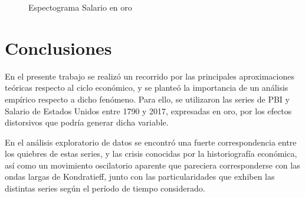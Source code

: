 \documentclass[a4paper]{article}
\begin{document}
\begin{figure}[H]
	\centering
	\caption{Espectograma Salario en oro} \label{fig:espect_wg}
\end{figure}



\section{Conclusiones}

En el presente trabajo se realizó un recorrido por las principales aproximaciones teóricas respecto al ciclo económico, y se planteó la importancia de un análisis empírico respecto a dicho fenómeno. Para ello, se utilizaron las series de PBI y Salario de Estados Unidos entre 1790 y 2017, expresadas en oro, por los efectos distorsivos que podría generar dicha variable. 

En el análisis exploratorio de datos se encontró una fuerte correspondencia entre los quiebres de estas series, y las crisis conocidas por la historiografía económica, así como un movimiento oscilatorio aparente que pareciera corresponderse con las ondas largas de Kondratieff, junto con las particularidades que exhiben las distintas series según el período de tiempo considerado.
\end{document}
